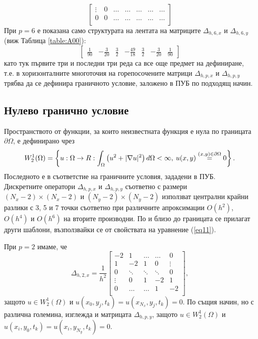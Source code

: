\documentclass[a4paper]{article}
\newcommand{\be}{\begin{equation}}
\newcommand{\ee}{\end{equation}}
\newcommand{\rf}[1]{(\ref{#1})}
\theoremstyle{remark}
\begin{document}
\begin{large}
\[\begin{bmatrix}
    \vdots    		 & 0        		 &	 \dots     	&  \dots              	&\dots 		 &  \dots 	&\dots   	\\
    0              	 & 0        		 &	 \dots     	&  \dots             	 &\dots 		 &  \dots 	&\dots 	\\
\end{bmatrix}
\]
При $p=6$ е показана само структурата на лентата на матриците $\Delta_{h,6,x}$ и $\Delta_{h,6,y}$ (виж Таблица \ref{table:A00}):
\[
\begin{bmatrix}
    \frac{1}{90}	& -\frac{3}{20}	& \frac{3}{2}         	& -\frac{49}{18}	&  \frac{3}{2}    	 &   -\frac{3}{20}	  &      \frac{1}{90}
\end{bmatrix}
\]
като тук първите три и последни три реда са все още предмет на дефиниране, т.е. в хоризонталните многоточия на горепосочените матрици $\Delta_{h,p,x}$ и $\Delta_{h,p,y}$ трябва да се дефинира граничното условие, заложено в ПУБ по подходящ начин.

\subsection{Нулево гранично условие}\label{zeroBndHead}
Пространството от функции, за които неизвестната функция е нула по границата $\partial\Omega$, е дефинирано чрез
\be\label{funSpace}
W_2^1(\Omega) =\left\{ u:\Omega \rightarrow \\R : \int_{\Omega} \left(u^2 + |\nabla u|^2 \right)d\Omega < \infty, \: u(x,y) \overset{(x, y) \in \partial\Omega}{=} 0 \right\}.
\ee
Последното е в съответстие на граничните условия, зададени в ПУБ. Дискретните оператори $\Delta_{h,p,x}$ и $\Delta_{h,p,y}$ съответно с размери $(N_x-2) \times (N_x-2)$ и $(N_y-2)\times(N_y-2)$ използват централни крайни разлики с 3, 5 и 7 точки съответно при различните апроксимации $O(h^2)$, $O(h^4)$ и $O(h^6)$ на вторите производни. По и близо до границата се прилагат други шаблони, възползвайки се от свойствата на уравнение \rf{eq11}. 

При $p=2$ имаме, че 
\[
\Delta_{h,2,x} = \frac{1}{h^2}
\begin{bmatrix}
    -2	       & 1        &     \dots   &   \dots        & 0   \\
    1               & -2            &   1           &   0               & \vdots    \\
        0           & \ddots        &    \ddots    &   \ddots       &  0 \\ 
    \vdots       &     0            &  1     	& -2    	   & 1 \\
    0               & \dots          &  \dots         & 1  	   & -2 \\
\end{bmatrix},
\]
защото $u \in W_2^1(\Omega)$ и $u(x_0, y_j, t_k) = u(x_{N_x}, y_j, t_k) = 0$. По същия начин, но с различна големина, изглежда и матрицата $\Delta_{h,p,y}$, защото $u \in W_2^1(\Omega)$ и $u(x_i, y_0, t_k) = u(x_i, y_{N_y}, t_k) = 0$. 


\end{large}
\end{document}
